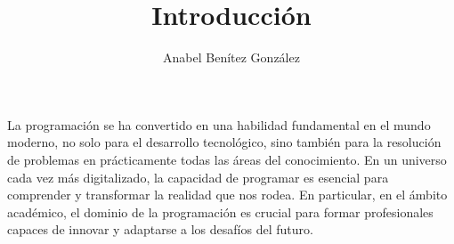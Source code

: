 \documentclass{article}
\title{Introducción}
\author{Anabel Benítez González}
\date{}
\begin{document}
\maketitle









La programación se ha convertido en una habilidad fundamental en el mundo moderno, no solo para el desarrollo tecnológico, sino también para la resolución de problemas en prácticamente todas las áreas del conocimiento. En un universo cada vez más digitalizado, la capacidad de programar es esencial para comprender y transformar la realidad que nos rodea. En particular, en el ámbito académico, el dominio de la programación es crucial para formar profesionales capaces de innovar y adaptarse a los desafíos del futuro.
\end{document}
